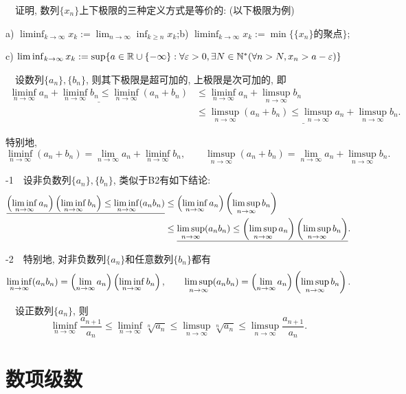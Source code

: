~~证明, 数列$\{ x_n \}$上下极限的三种定义方式是等价的: (以下极限为例)

a) $\liminf_{k\to \infty} x_k:=\lim_{n\to \infty} \inf_{k \geq n} x_k$;\qquad b) $\liminf_{k\to \infty} x_k:= \min  \{\{ x_n \}\text{的聚点} \}$; 

c) $\liminf_{k\to \infty} x_k:= \sup \{ a\in \mathbb{R} \cup \{ -\infty \}: \forall \varepsilon >0, \exists N \in \mathbb{N}^{*} (\forall n>N, x_n>a-\varepsilon ) \}$
\vspace{1em}

~~设数列$\{ a_n \}, \{ b_n \}$, 则其下极限是超可加的, 上极限是次可加的, 即
\begin{align*}
	\underline{\liminf_{n\to \infty} a_n + \liminf_{n\to \infty} b_n \leq \liminf_{n\to \infty} (a_n+b_n) }&\leq \liminf_{n\to \infty} a_n + \limsup_{n\to \infty} b_n \\
	&\leq \underline{\limsup_{n\to \infty} (a_n+b_n) \leq \limsup_{n\to \infty} a_n + \limsup_{n\to \infty} b_n}.
\end{align*}

特别地, $$\liminf_{n\to \infty} (a_n+b_n)  = \lim_{n\to \infty} a_n + \liminf_{n\to \infty} b_n , \qquad \limsup_{n\to \infty} (a_n+b_n)  = \lim_{n\to \infty} a_n + \limsup_{n\to \infty} b_n. $$

-1~~设非负数列$\{ a_n \}, \{ b_n \}$, 类似于B2有如下结论: 
\begin{align*}
	\underline{\left( \liminf_{n\to \infty} a_n \right)\left(  \liminf_{n\to \infty} b_n \right) \leq \liminf_{n\to \infty} (a_nb_n) } &\leq \left( \liminf_{n\to \infty} a_n \right)\left(  \limsup_{n\to \infty} b_n \right) \\
	&\leq \underline{\limsup_{n\to \infty} (a_nb_n) \leq \left( \limsup_{n\to \infty} a_n \right)\left(  \limsup_{n\to \infty} b_n \right)}.
\end{align*}

-2~~特别地, 对非负数列$\{ a_n \}$和任意数列$\{ b_n \}$都有$$\liminf_{n\to \infty} (a_nb_n) = \left( \lim_{n\to \infty} a_n \right) \left( \liminf_{n\to \infty} b_n \right), \qquad \limsup_{n\to \infty} (a_nb_n) = \left( \lim_{n\to \infty} a_n \right) \left( \limsup_{n\to \infty} b_n \right).$$

~~设正数列$\{ a_n \}$, 则$$\liminf_{n\to \infty} \frac{a_{n+1}}{a_n} \leq \liminf_{n\to \infty} \sqrt[n]{a_n} \leq \limsup_{n\to \infty} \sqrt[n]{a_n} \leq \limsup_{n\to \infty} \frac{a_{n+1}}{a_n}. $$




\newpage
\section{数项级数}

